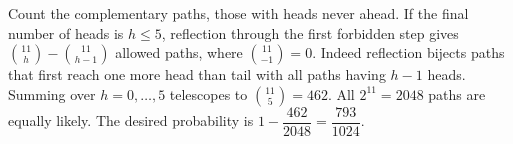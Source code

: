 Count the complementary paths, those with heads never ahead. If the final number of heads is $h\le5$, reflection through the first forbidden step gives $\binom{11}{h}-\binom{11}{h-1}$ allowed paths, where $\binom{11}{-1}=0$. Indeed reflection bijects paths that first reach one more head than tail with all paths having $h-1$ heads. Summing over $h=0,\ldots,5$ telescopes to $\binom{11}{5}=462$. All $2^{11}=2048$ paths are equally likely. The desired probability is $1-\dfrac{462}{2048}=\boxed{\dfrac{793}{1024}}$.
